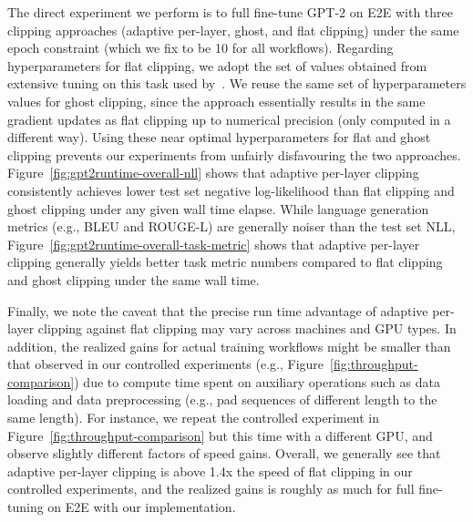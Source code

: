 The direct experiment we perform is to full fine-tune GPT-2 on E2E with three clipping approaches (adaptive per-layer, ghost, and flat clipping) under the same epoch constraint (which we fix to be 10 for all workflows).
Regarding hyperparameters for flat clipping, we adopt the set of values obtained from extensive tuning on this task used by~\cite{li2022large}.
We reuse the same set of hyperparameters values for ghost clipping, since the approach essentially results in the same gradient updates as flat clipping up to numerical precision (only computed in a different way).
Using these near optimal hyperparameters for flat and ghost clipping prevents our experiments from unfairly disfavouring the two approaches.
Figure~\ref{fig:gpt2runtime-overall-nll} shows that adaptive per-layer clipping consistently achieves lower test set negative log-likelihood than flat clipping and ghost clipping under any given wall time elapse.
While language generation metrics (e.g., BLEU and ROUGE-L) are generally noiser than the test set NLL, Figure~\ref{fig:gpt2runtime-overall-task-metric} shows that adaptive per-layer clipping generally yields better task metric numbers compared to flat clipping and ghost clipping under the same wall time.

Finally, we note the caveat that the precise run time advantage of adaptive per-layer clipping against flat clipping may vary across machines and GPU types.
In addition, the realized gains for actual training workflows might be smaller than that observed in our controlled experiments (e.g., Figure~\ref{fig:throughput-comparison}) due to compute time spent on auxiliary operations such as data loading and data preprocessing (e.g., pad sequences of different length to the same length). 
For instance, we repeat the controlled experiment in Figure~\ref{fig:throughput-comparison} but this time with a different GPU, and observe slightly different factors of speed gains. 
Overall, we generally see that adaptive per-layer clipping is above 1.4x the speed of flat clipping in our controlled experiments, and the realized gains is roughly as much for full fine-tuning on E2E with our implementation.

